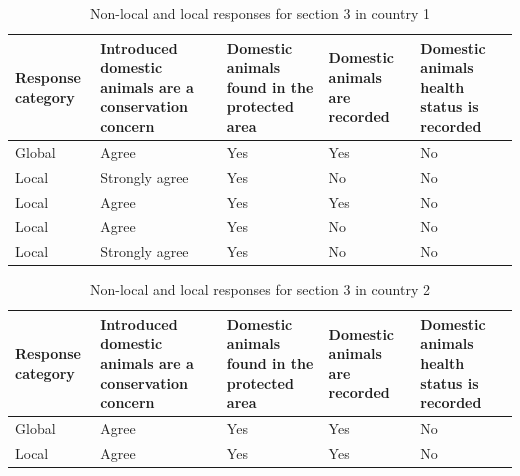 \documentclass[
  letterpaper,
  DIV=11,
  numbers=noendperiod]{scrartcl}
\begin{document}
\begin{table}[H]

\caption{Non-local and local responses for section 3 in country 1}
\centering
\begin{tabular}[t]{>{\raggedright\arraybackslash}p{2cm}|>{\raggedright\arraybackslash}p{3cm}|>{\raggedright\arraybackslash}p{2cm}|>{\raggedright\arraybackslash}p{2cm}|>{\raggedright\arraybackslash}p{2cm}}
\hline
Response
category & Introduced domestic
animals are
a conservation
concern & Domestic animals
found in the
protected area & Domestic animals
are recorded & Domestic animals
health status
is recorded\\
\hline
Global & Agree & Yes & Yes & No\\
\hline
Local & Strongly agree & Yes & No & \vphantom{1} No\\
\hline
Local & Agree & Yes & Yes & No\\
\hline
Local & Agree & Yes & No & No\\
\hline
Local & Strongly agree & Yes & No & No\\
\hline
\end{tabular}
\end{table}

\begin{table}[H]

\caption{Non-local and local responses for section 3 in country 2}
\centering
\begin{tabular}[t]{>{\raggedright\arraybackslash}p{2cm}|>{\raggedright\arraybackslash}p{3cm}|>{\raggedright\arraybackslash}p{2cm}|>{\raggedright\arraybackslash}p{2cm}|>{\raggedright\arraybackslash}p{2cm}}
\hline
Response
category & Introduced domestic
animals are
a conservation
concern & Domestic animals
found in the
protected area & Domestic animals
are recorded & Domestic animals
health status
is recorded\\
\hline
Global & Agree & Yes & Yes & No\\
\hline
Local & Agree & Yes & Yes & No\\
\hline
\end{tabular}
\end{table}
\end{document}
